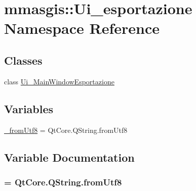\hypertarget{namespacemmasgis_1_1Ui__esportazione}{
\section{mmasgis::Ui\_\-esportazione Namespace Reference}
\label{namespacemmasgis_1_1Ui__esportazione}
}
\subsection*{Classes}
\begin{DoxyCompactItemize}
\item 
class \hyperlink{classmmasgis_1_1Ui__esportazione_1_1Ui__MainWindowEsportazione}{Ui\_\-MainWindowEsportazione}
\end{DoxyCompactItemize}
\subsection*{Variables}
\begin{DoxyCompactItemize}
\item 
\hyperlink{namespacemmasgis_1_1Ui__esportazione_a1853f4ade8c67a7af01192ea296c7cbc}{\_\-fromUtf8} = QtCore.QString.fromUtf8
\end{DoxyCompactItemize}


\subsection{Variable Documentation}
\hypertarget{namespacemmasgis_1_1Ui__esportazione_a1853f4ade8c67a7af01192ea296c7cbc}{
\subsubsection[{\_\-fromUtf8}]{ = QtCore.QString.fromUtf8}}
\label{namespacemmasgis_1_1Ui__esportazione_a1853f4ade8c67a7af01192ea296c7cbc}
